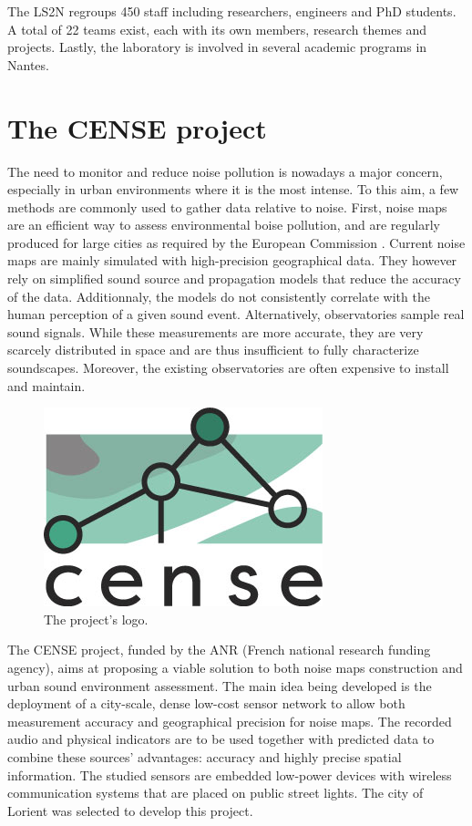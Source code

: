 \documentclass[12pt,times,onecolumn]{article}
\begin{document}
The LS2N regroups 450 staff including researchers, engineers and PhD students. A total of 22 teams exist, each with its own members, research themes and projects. Lastly, the laboratory is involved in several academic programs in Nantes.

\section{The CENSE project}

The need to monitor and reduce noise pollution is nowadays a major concern, especially in urban environments where it is the most intense. To this aim, a few methods are commonly used to gather data relative to noise. First, noise maps are an efficient way to assess environmental boise pollution, and are regularly produced for large cities as required by the European Commission \cite{euc2002}. Current noise maps are mainly simulated with high-precision geographical data. They however rely on simplified sound source and propagation models that reduce the accuracy of the data. Additionnaly, the models do not consistently correlate with the human perception of a given sound event. Alternatively, observatories sample real sound signals. While these measurements are more accurate, they are very scarcely distributed in space and are thus insufficient to fully characterize soundscapes. Moreover, the existing observatories are often expensive to install and maintain.\\

\begin{figure}[htbp]
	\centering
		\includegraphics[width=0.4\columnwidth]{figures/CENSE-logo.jpg}
	\caption{The project's logo.}
	\label{fig:cense_logo}
\end{figure}

The CENSE project, funded by the ANR (French national research funding agency), aims at proposing a viable solution to both noise maps construction and urban sound environment assessment. The main idea being developed is the deployment of a city-scale, dense low-cost sensor network to allow both measurement accuracy and geographical precision for noise maps. The recorded audio and physical indicators are to be used together with predicted data to combine these sources' advantages: accuracy and highly precise spatial information. The studied sensors are embedded low-power devices with wireless communication systems that are placed on public street lights. The city of Lorient was selected to develop this project.\\
\end{document}
